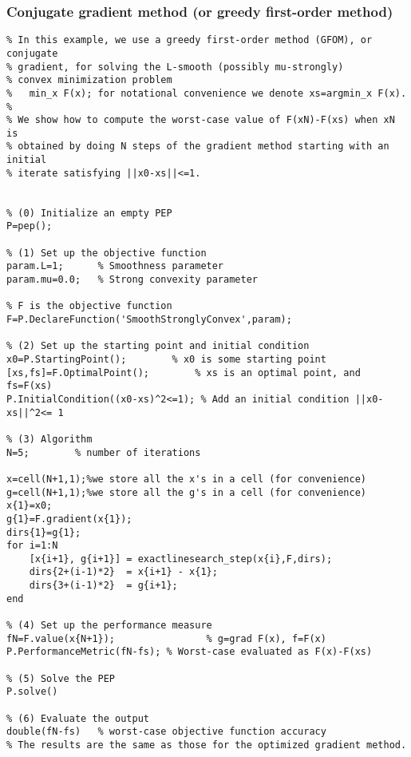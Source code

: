 \documentclass[11pt,a4paper]{article}
\begin{document}
\subsubsection{Conjugate gradient method (or greedy first-order method)}
\begin{lstlisting}
% In this example, we use a greedy first-order method (GFOM), or conjugate
% gradient, for solving the L-smooth (possibly mu-strongly) 
% convex minimization problem
%   min_x F(x); for notational convenience we denote xs=argmin_x F(x).
%
% We show how to compute the worst-case value of F(xN)-F(xs) when xN is
% obtained by doing N steps of the gradient method starting with an initial
% iterate satisfying ||x0-xs||<=1.


% (0) Initialize an empty PEP
P=pep();

% (1) Set up the objective function
param.L=1;      % Smoothness parameter
param.mu=0.0;   % Strong convexity parameter

% F is the objective function
F=P.DeclareFunction('SmoothStronglyConvex',param); 

% (2) Set up the starting point and initial condition
x0=P.StartingPoint();		 % x0 is some starting point
[xs,fs]=F.OptimalPoint(); 		 % xs is an optimal point, and fs=F(xs)
P.InitialCondition((x0-xs)^2<=1); % Add an initial condition ||x0-xs||^2<= 1

% (3) Algorithm
N=5;		% number of iterations

x=cell(N+1,1);%we store all the x's in a cell (for convenience)
g=cell(N+1,1);%we store all the g's in a cell (for convenience)
x{1}=x0;
g{1}=F.gradient(x{1});
dirs{1}=g{1};
for i=1:N
	[x{i+1}, g{i+1}] = exactlinesearch_step(x{i},F,dirs);
	dirs{2+(i-1)*2}  = x{i+1} - x{1};
	dirs{3+(i-1)*2}  = g{i+1};
end

% (4) Set up the performance measure
fN=F.value(x{N+1});                % g=grad F(x), f=F(x)
P.PerformanceMetric(fN-fs); % Worst-case evaluated as F(x)-F(xs)

% (5) Solve the PEP
P.solve()

% (6) Evaluate the output
double(fN-fs)   % worst-case objective function accuracy
% The results are the same as those for the optimized gradient method.
\end{lstlisting}
\newpage
\end{document}
